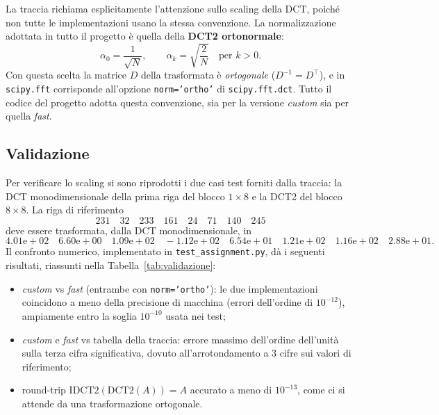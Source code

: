 \documentclass[11pt,a4paper]{article}
\begin{document}
La traccia richiama esplicitamente l'attenzione sullo scaling della DCT, poiché
non tutte le implementazioni usano la stessa convenzione. La normalizzazione
adottata in tutto il progetto è quella della \textbf{DCT2 ortonormale}:
\[
\alpha_0 = \frac{1}{\sqrt{N}}, \qquad
\alpha_k = \sqrt{\frac{2}{N}} \quad \text{per } k>0.
\]
Con questa scelta la matrice $D$ della trasformata è \emph{ortogonale}
($D^{-1}=D^\top$), e in \texttt{scipy.fft} corrisponde all'opzione
\texttt{norm='ortho'} di \texttt{scipy.fft.dct}. Tutto il codice del progetto
adotta questa convenzione, sia per la versione \emph{custom} sia per quella
\emph{fast}.

\subsection{Validazione}\label{sec:validazione}

Per verificare lo scaling si sono riprodotti i due casi test forniti dalla
traccia: la DCT monodimensionale della prima riga del blocco $1\times 8$ e la
DCT2 del blocco $8\times 8$. La riga di riferimento
\[
231\quad 32\quad 233\quad 161\quad 24\quad 71\quad 140\quad 245
\]
deve essere trasformata, dalla DCT monodimensionale, in
\[
4.01\mathrm{e}{+}02 \quad 6.60\mathrm{e}{+}00 \quad 1.09\mathrm{e}{+}02
\quad -1.12\mathrm{e}{+}02 \quad 6.54\mathrm{e}{+}01 \quad 1.21\mathrm{e}{+}02
\quad 1.16\mathrm{e}{+}02 \quad 2.88\mathrm{e}{+}01.
\]
Il confronto numerico, implementato in \texttt{test\_assignment.py}, dà i
seguenti risultati, riassunti nella Tabella~\ref{tab:validazione}:
\begin{itemize}
  \item \emph{custom} vs \emph{fast} (entrambe con \texttt{norm='ortho'}): le due
        implementazioni coincidono a meno della precisione di macchina (errori
        dell'ordine di $10^{-12}$), ampiamente entro la soglia $10^{-10}$ usata
        nei test;
  \item \emph{custom} e \emph{fast} vs tabella della traccia: errore massimo
        dell'ordine dell'unità sulla terza cifra significativa, dovuto
        all'arrotondamento a $3$ cifre sui valori di riferimento;
  \item round-trip $\mathrm{IDCT2}(\mathrm{DCT2}(A)) = A$ accurato a meno di
        $10^{-13}$, come ci si attende da una trasformazione ortogonale.
\end{itemize}
\end{document}
